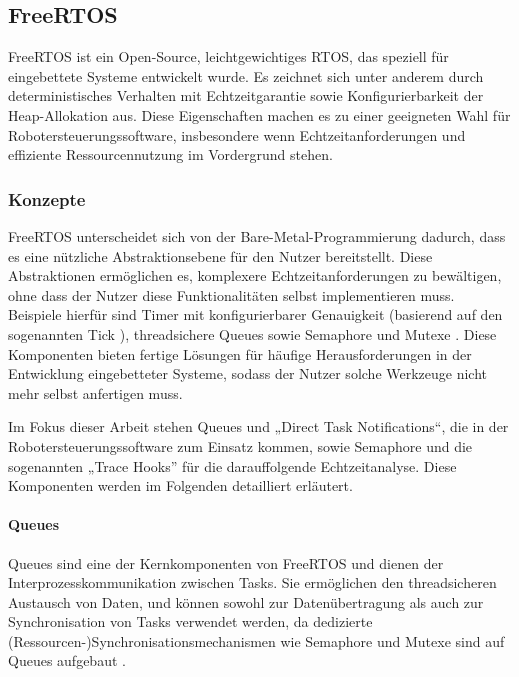 \subsection{FreeRTOS}

FreeRTOS ist ein Open-Source, leichtgewichtiges \ac{RTOS}, das speziell für
eingebettete Systeme entwickelt wurde. Es zeichnet sich unter anderem durch
deterministisches Verhalten mit Echtzeitgarantie sowie Konfigurierbarkeit der
Heap-Allokation aus. Diese Eigenschaften machen es zu einer geeigneten Wahl für
Robotersteuerungssoftware, insbesondere wenn Echtzeitanforderungen und
effiziente Ressourcennutzung im Vordergrund stehen.

\subsubsection{Konzepte}

FreeRTOS unterscheidet sich von der Bare-Metal-Programmierung dadurch, dass es
eine nützliche Abstraktionsebene für den Nutzer bereitstellt. Diese
Abstraktionen ermöglichen es, komplexere Echtzeitanforderungen zu bewältigen,
ohne dass der Nutzer diese Funktionalitäten selbst implementieren muss.
Beispiele hierfür sind Timer mit konfigurierbarer Genauigkeit (basierend auf den
sogenannten Tick \cite{freertos_rtos_tick, freertos_tick_resolution}),
threadsichere Queues sowie Semaphore und Mutexe \cite{freertos_queues}. Diese
Komponenten bieten fertige Lösungen für häufige Herausforderungen in der
Entwicklung eingebetteter Systeme, sodass der Nutzer solche Werkzeuge nicht mehr
selbst anfertigen muss.

Im Fokus dieser Arbeit stehen Queues und „Direct Task Notifications“, die in der
Robotersteuerungssoftware zum Einsatz kommen, sowie Semaphore und die
sogenannten „Trace Hooks” für die darauffolgende Echtzeitanalyse. Diese
Komponenten werden im Folgenden detailliert erläutert.

\paragraph{Queues}

Queues sind eine der Kernkomponenten von FreeRTOS und dienen der
Interprozesskommunikation zwischen Tasks. Sie ermöglichen den threadsicheren
Austausch von Daten, und können sowohl zur Datenübertragung als auch zur
Synchronisation von Tasks verwendet werden, da dedizierte
(Ressourcen-)Synchronisationsmechanismen wie Semaphore und Mutexe sind auf
Queues aufgebaut \cite{freertos_semphr_incl}.

